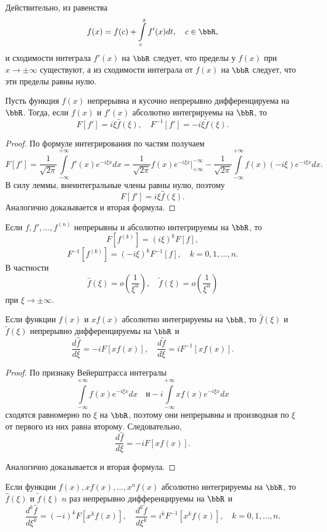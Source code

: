 Действительно, из равенства
$$
f(x)=f(c)+\int\limits_c^x f'(x)dt,\quad c\in\bbR,
$$
и сходимости интеграла $f'(x)$ на $\bbR$ следует, что пределы у $f(x)$ при $x\to\pm\infty$ существуют, а из сходимости интеграла от $f(x)$ на $\bbR$ следует, что эти пределы равны нулю.

\begin{thm}
Пусть функция $f(x)$ непрерывна и кусочно непрерывно дифференцируема на $\bbR$. Тогда, если $f(x)$ и $f'(x)$ абсолютно интегрируемы на $\bbR$, то
$$
F[f']=i\xi\widehat{f}(\xi),\quad F^{-1}[f']=-i\xi \widetilde{f}(\xi).
$$
\end{thm}

\begin{proof}
По формуле интегрирования по частям получаем
$$
F[f']=\frac{1}{\sqrt{2\pi}}\int\limits_{-\infty}^{+\infty} f'(x)e^{-i\xi x}dx={\frac{1}{\sqrt{2\pi}}f(x)e^{-i\xi x}}	
\big|^{-\infty}_{+\infty} - \frac{1}{\sqrt{2\pi}}\int\limits_{-\infty}^{+\infty}f(x)(-i\xi)e^{-i\xi x}dx.
$$
В силу леммы, внеинтегральные члены равны нулю, поэтому
$$
F[f']=i\xi\widehat{f}(\xi).
$$
Аналогично доказывается и вторая формула.
\end{proof}

\begin{cons}
Если $f,f',...,f^{(n)}$ непрерывны и абсолютно интегрируемы на $\bbR$, то
$$
F[f^{(k)}]=(i\xi)^kF[f],
$$
$$
F^{-1}[f^{(k)}]=(-i\xi)^kF^{-1}[f], \quad k=0,1,...,n.
$$
В частности
$$
\widehat{f}(\xi)=o\left(\frac{1}{\xi^n}\right),\quad \widetilde{f}(\xi)=o\left(\frac{1}{\xi^n}\right)
$$
при $\xi\to\pm\infty$.
\end{cons}

\begin{thm}
Если функции $f(x)$ и  $xf(x)$ абсолютно интегрируемы на $\bbR$, то $\widehat{f}(\xi)$ и $\widetilde{f}(\xi)$ непрерывно дифференцируемы на $\bbR$ и 
$$
\frac{d\widehat{f}}{d\xi}=-iF[xf(x)],\quad \frac{d\widetilde{f}}{d\xi}=iF^{-1}[xf(x)].
$$
\end{thm}

\begin{proof}
По признаку Вейерштрасса интегралы
$$
\int\limits_{-\infty}^{+\infty}f(x)e^{-i\xi x}dx\quad \text{и} -i\int\limits_{-\infty}^{+\infty}xf(x)e^{-i\xi x}dx
$$
сходятся равномерно по $\xi$ на $\bbR$, поэтому они непрерывны и производная по $\xi$ от первого из них равна второму. Следовательно,
$$
\frac{d\widehat{f}}{d\xi}=-iF[xf(x)].
$$

Аналогично доказывается и вторая формула.
\end{proof}

\begin{cons}
Если функции $f(x),xf(x),...,x^nf(x)$ абсолютно интегрируемы на $\bbR$, то $\widehat{f}(\xi)$ и $\widetilde{f}(\xi)$ $n$ раз непрерывно дифференцируемы на $\bbR$ и 
$$
\frac{d^k\widehat{f}}{d\xi^k}=(-i)^kF[x^kf(x)],\quad \frac{d^k\widetilde{f}}{d\xi^k} = i^kF^{-1}[x^kf(x)],\quad k=0,1,...,n.
$$
\end{cons}
